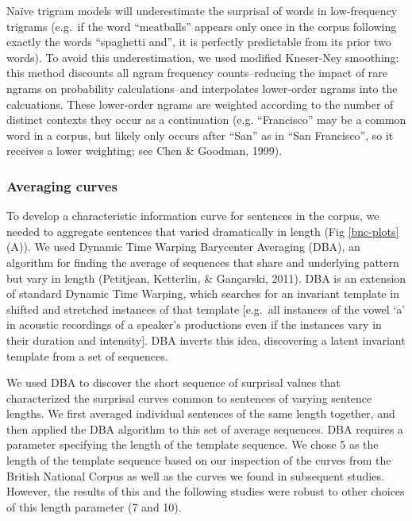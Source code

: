 \documentclass[10pt, letterpaper]{article}
\begin{document}
Naïve trigram models will underestimate the surprisal of words in
low-frequency trigrams (e.g.~if the word ``meatballs'' appears only once
in the corpus following exactly the words ``spaghetti and'', it is
perfectly predictable from its prior two words). To avoid this
underestimation, we used modified Kneser-Ney smoothing: this method
discounts all ngram frequency counts--reducing the impact of rare ngrams
on probability calculations--and interpolates lower-order ngrams into
the calcuations. These lower-order ngrams are weighted according to the
number of distinct contexts they occur as a continuation (e.g.
``Francisco'' may be a common word in a corpus, but likely only occurs
after ``San'' as in ``San Francisco'', so it receives a lower weighting;
see Chen \& Goodman, 1999).

\hypertarget{averaging-curves}{%
\subsubsection{Averaging curves}\label{averaging-curves}}

To develop a characteristic information curve for sentences in the
corpus, we needed to aggregate sentences that varied dramatically in
length (Fig \ref{bnc-plots}(A)). We used Dynamic Time Warping Barycenter
Averaging (DBA), an algorithm for finding the average of sequences that
share and underlying pattern but vary in length (Petitjean, Ketterlin,
\& Gançarski, 2011). DBA is an extension of standard Dynamic Time
Warping, which searches for an invariant template in shifted and
stretched instances of that template {[}e.g.~all instances of the vowel
`a' in acoustic recordings of a speaker's productions even if the
instances vary in their duration and intensity{]}. DBA inverts this
idea, discovering a latent invariant template from a set of sequences.

We used DBA to discover the short sequence of surprisal values that
characterized the surprisal curves common to sentences of varying
sentence lengths. We first averaged individual sentences of the same
length together, and then applied the DBA algorithm to this set of
average sequences. DBA requires a parameter specifying the length of the
template sequence. We chose 5 as the length of the template sequence
based on our inspection of the curves from the British National Corpus
as well as the curves we found in subsequent studies. However, the
results of this and the following studies were robust to other choices
of this length parameter (7 and 10).
\end{document}
